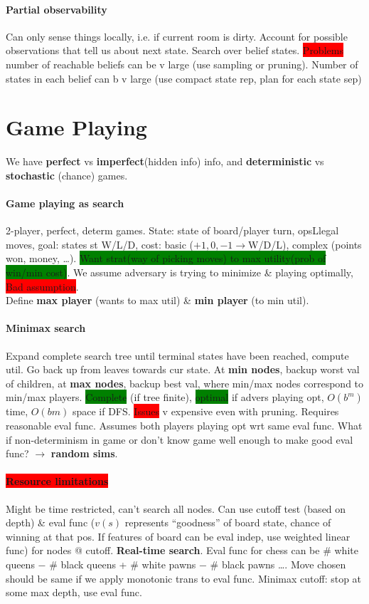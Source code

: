 \paragraph{Partial observability} Can only sense things locally,
i.e. if current room is dirty. Account for possible observations that
tell us about next state. Search over belief
states. \colorbox{red}{Problems} number of reachable beliefs can be v
large (use sampling or pruning). Number of states in each belief can b
v large (use compact state rep, plan for each state sep)
\color[HTML]{8A2BE2}
\section{Game Playing} We have \textbf{perfect} vs
\textbf{imperfect}(hidden info) info, and \textbf{deterministic} vs
\textbf{stochastic} (chance) games.
\paragraph{Game playing as search} 2-player, perfect, determ
games. State: state of board/player turn, opsLlegal moves, goal:
states st W/L/D, cost: basic ($+1, 0, -1 \to $W/D/L), complex (points
won, money, \ldots). \colorbox{green}{Want strat(way of picking moves)
  to max utility(prob of win/min cost)}. We assume adversary is trying
to minimize \& playing optimally, \colorbox{red}{Bad assumption}.
\\ Define \textbf{max player} (wants to max util) \& \textbf{min
  player} (to min util).
\paragraph{Minimax search} Expand complete search tree until terminal
states have been reached, compute util. Go back up from leaves towards
cur state. At \textbf{min nodes}, backup worst val of children, at \textbf{max nodes},
backup best val, where min/max nodes correspond to min/max
players. \colorbox{green}{Complete} (if tree finite),
\colorbox{green}{optimal} if advers playing opt, $O(b^m)$ time,
$O(bm)$ space if DFS. \colorbox{red}{Issues} v expensive even with
pruning. Requires reasonable eval func. Assumes both players playing
opt wrt same eval func. What if non-determinism in game or don't know
game well enough to make good eval func? $\to$ \textbf{random sims}.
\paragraph{\colorbox{red}{Resource limitations}} Might be time
restricted, can't search all nodes. Can use cutoff test (based on
depth) \& eval func ($v(s)$ represents ``goodness'' of board state,
chance of winning at that pos. If features of board can be eval indep,
use weighted linear func) for nodes @ cutoff. \textbf{Real-time
  search}. Eval func for chess can be \# white queens $-$ \# black
queens + \# white pawns $-$ \# black pawns \ldots. Move chosen should
be same if we apply monotonic trans to eval func. Minimax cutoff: stop
at some max depth, use eval func.
